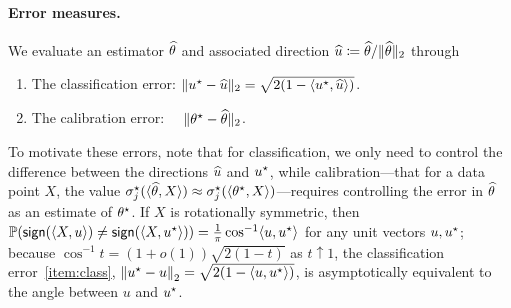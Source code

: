 \paragraph{Error measures.}
We evaluate an estimator $\widehat{\theta}$ and associated direction $\widehat{u}
\coloneqq \widehat{\theta} / \|{\widehat{\theta}}\|_2$ through
\begin{enumerate}[leftmargin=10em,label=(\textsc{E}.\roman*)]
\item \label{item:class}
  The classification error: $\|{u^\star - \widehat{u}}\|_2
  = \sqrt{2(1 - \langle u^\star, \widehat{u}\rangle)}$.
\item \label{item:cal}
  The calibration error:~~ $\|{\theta^\star - \widehat{\theta}}\|_2$.
\end{enumerate}
To motivate these errors, note that for classification, we only need to
control the difference between the directions $\widehat{u}$ and $u^\star$, while
calibration---that for a data point $X$, the value $\sigma_j^\star( \langle
\widehat{\theta}, X \rangle)\approx \sigma_j^\star(\langle \theta^\star, X \rangle)$---requires
controlling the error in $\widehat{\theta}$ as an estimate of $\theta^\star$.
%
If $X$ is rotationally symmetric,
then $\mathbb{P}(\mathsf{sign}(\langle X, u\rangle) \neq \mathsf{sign}(\langle X, u^\star\rangle)) = \frac{1}{\pi}
\cos^{-1}\langle u, u^\star\rangle$ for any unit vectors $u, u^\star$; because $\cos^{-1} t
= (1 + o(1)) \sqrt{2(1 - t)}$ as $t \uparrow 1$, the classification
error~\ref{item:class}, $\left\|{u^\star - u}\right\|_2 =
\sqrt{2(1 - \langle u, u^\star\rangle)}$, is asymptotically equivalent to the angle
between $u$ and $u^\star$.

